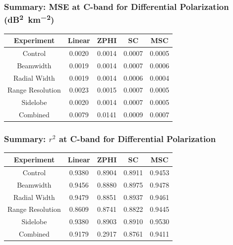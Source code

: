 \documentclass[red]{beamer}
\begin{document}
\begin{frame}
    \frametitle{Summary: MSE at C-band for Differential Polarization (\si{dB\squared\per \kilo\meter\squared})}
    \begin{center}
        \begin{tabular}{| c | c | c | c | c |}
            \hline
            Experiment & Linear & ZPHI & SC & MSC \\
            \hline
            \hline
            Control & 0.0020 & 0.0014 & 0.0007 & 0.0005 \\
            Beamwidth & 0.0019 & 0.0014 & 0.0007 & 0.0006 \\
            Radial Width & 0.0019 & 0.0014 & 0.0006 & 0.0004 \\
            Range Resolution & 0.0023 & 0.0015 & 0.0007 & 0.0005 \\
            Sidelobe & 0.0020 & 0.0014 & 0.0007 & 0.0005 \\
            Combined & 0.0079 & 0.0141 & 0.0009 & 0.0007 \\
            \hline
        \end{tabular}
    \end{center}
\end{frame}

\begin{frame}
    \frametitle{Summary: $r^2$ at C-band for Differential Polarization}
    \begin{center}
        \begin{tabular}{| c | c | c | c | c |}
            \hline
            Experiment & Linear & ZPHI & SC & MSC \\
            \hline
            \hline
            Control & 0.9380 & 0.8904 & 0.8911 & 0.9453 \\
            Beamwidth & 0.9456 & 0.8880 & 0.8975 & 0.9478 \\
            Radial Width & 0.9479 & 0.8851 & 0.8937 & 0.9461 \\
            Range Resolution & 0.8609 & 0.8741 & 0.8822 & 0.9445 \\
            Sidelobe & 0.9380 & 0.8903 & 0.8910 & 0.9530 \\
            Combined & 0.9179 & 0.2917 & 0.8761 & 0.9411 \\
            \hline
        \end{tabular}
    \end{center}
\end{frame}
\end{document}

